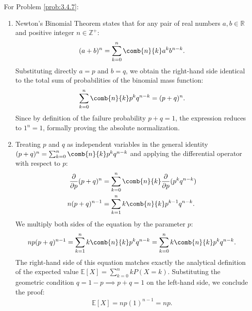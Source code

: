 \begin{solucion}
	\label{sol:3.4.7}
	For Problem \ref{prob:3.4.7}:
	\begin{enumerate}
		\item Newton's Binomial Theorem states that for any pair of real numbers $a, b \in \mathbb{R}$ and positive integer $n \in \mathbb{Z}^+$:
		\begin{align*}
			(a + b)^n = \sum_{k=0}^n \comb{n}{k} a^k b^{n-k}.
		\end{align*}
		Substituting directly $a = p$ and $b = q$, we obtain the right-hand side identical to the total sum of probabilities of the binomial mass function:
		\begin{align*}
			\sum_{k=0}^n \comb{n}{k} p^k q^{n-k} = (p + q)^n.
		\end{align*}
		Since by definition of the failure probability $p + q = 1$, the expression reduces to $1^n = 1$, formally proving the absolute normalization.
		\item Treating $p$ and $q$ as independent variables in the general identity $(p+q)^n = \sum_{k=0}^n \comb{n}{k} p^k q^{n-k}$ and applying the differential operator with respect to $p$:
		\begin{align*}
			\dfrac{\partial}{\partial p} (p+q)^n &= \sum_{k=0}^n \comb{n}{k} \dfrac{\partial}{\partial p} (p^k q^{n-k}) \\
			n(p+q)^{n-1} &= \sum_{k=1}^n k \comb{n}{k} p^{k-1} q^{n-k}.
		\end{align*}
		We multiply both sides of the equation by the parameter $p$:
		\begin{align*}
			np(p+q)^{n-1} = \sum_{k=1}^n k \comb{n}{k} p^k q^{n-k} = \sum_{k=0}^n k \comb{n}{k} p^k q^{n-k}.
		\end{align*}
		The right-hand side of this equation matches exactly the analytical definition of the expected value $\mathbb{E}[X] = \sum_{k=0}^n k P(X = k)$. Substituting the geometric condition $q = 1-p \implies p+q=1$ on the left-hand side, we conclude the proof:
		\begin{align*}
			\mathbb{E}[X] = np(1)^{n-1} = np.
		\end{align*}
	\end{enumerate}
\end{solucion}

